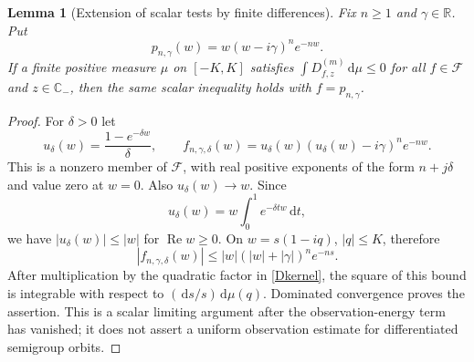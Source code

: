 \documentclass[11pt,a4paper]{article}
\newtheorem{lemma}[theorem]{Lemma}
\theoremstyle{definition}\newtheorem{definition}[theorem]{Definition}
\theoremstyle{remark}\newtheorem{remark}[theorem]{Remark}
\newcommand{\C}{\mathbb C}\newcommand{\R}{\mathbb R}\newcommand{\N}{\mathbb N}
\newcommand{\F}{\mathcal F}\newcommand{\Prob}{\mathcal P}
\newcommand{\dd}{\,\mathrm d}
\DeclareMathOperator{\Rea}{Re}\DeclareMathOperator{\Ima}{Im}
\begin{document}
\begin{lemma}[Extension of scalar tests by finite differences]\label{approx}
Fix $n\ge1$ and $\gamma\in\R$. Put
\begin{equation}\label{polyfilter}
 p_{n,\gamma}(w)=w(w-i\gamma)^n e^{-nw}.
\end{equation}
If a finite positive measure $\mu$ on $[-K,K]$ satisfies
$\int D_{f,z}^{(m)}\dd\mu\le0$ for all $f\in\F$ and $z\in\C_-$, then the same scalar inequality holds with $f=p_{n,\gamma}$.
\end{lemma}
\begin{proof}
For $\delta>0$ let
\[
 u_\delta(w)=\frac{1-e^{-\delta w}}{\delta},\qquad
 f_{n,\gamma,\delta}(w)=u_\delta(w)
       (u_\delta(w)-i\gamma)^n e^{-nw}.
\]
This is a nonzero member of $\F$, with real positive exponents of the form $n+j\delta$ and value zero at $w=0$. Also $u_\delta(w)\to w$. Since
\[
 u_\delta(w)=w\int_0^1e^{-\delta tw}\dd t,
\]
we have $|u_\delta(w)|\le|w|$ for $\Rea w\ge0$. On $w=s(1-iq)$, $|q|\le K$, therefore
\[
 |f_{n,\gamma,\delta}(w)|
 \le |w|(|w|+|\gamma|)^n e^{-ns}.
\]
After multiplication by the quadratic factor in \eqref{Dkernel}, the square of this bound is integrable with respect to $(\dd s/s)\dd\mu(q)$. Dominated convergence proves the assertion. This is a scalar limiting argument after the observation-energy term has vanished; it does not assert a uniform observation estimate for differentiated semigroup orbits.
\end{proof}
\end{document}
